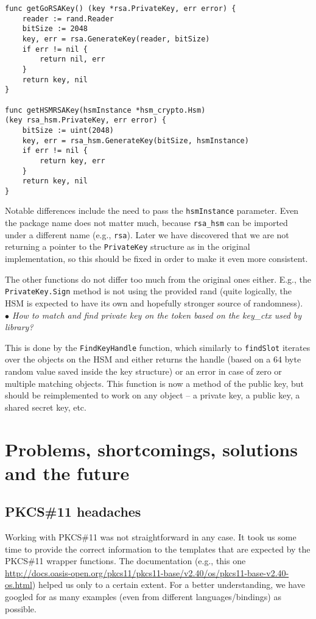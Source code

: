 \documentclass[a4paper]{scrartcl}
\begin{document}
\begin{lstlisting}[caption=Initialization of the HSM, captionpos=b, label={lst:rsaComp}]
func getGoRSAKey() (key *rsa.PrivateKey, err error) {
    reader := rand.Reader
    bitSize := 2048
    key, err = rsa.GenerateKey(reader, bitSize)
    if err != nil {
        return nil, err
    }
    return key, nil
}

func getHSMRSAKey(hsmInstance *hsm_crypto.Hsm)
(key rsa_hsm.PrivateKey, err error) {
    bitSize := uint(2048)
    key, err = rsa_hsm.GenerateKey(bitSize, hsmInstance)
    if err != nil {
        return key, err
    }
    return key, nil
}
\end{lstlisting}

Notable differences include the need to pass the \lstinline[columns=fixed]{hsmInstance} parameter. Even the package name does not matter much, because \lstinline[columns=fixed]{rsa_hsm} can be imported under a different name (e.g., \lstinline[columns=fixed]{rsa}). Later we have discovered that we are not returning a pointer to the \lstinline[columns=fixed]{PrivateKey} structure as in the original implementation, so this should be fixed in order to make it even more consistent.

The other functions do not differ too much from the original ones either. E.g., the \lstinline[columns=fixed]{PrivateKey.Sign} method is not using the provided rand (quite logically, the HSM is expected to have its own and hopefully stronger source of randomness).\\

\textit{$\bullet$ How to match and find private key on the token based on the key\_ctx used by library?}

This is done by the \lstinline[columns=fixed]{FindKeyHandle} function, which similarly to \lstinline[columns=fixed]{findSlot} iterates over the objects on the HSM and either returns the handle (based on a 64 byte random value saved inside the key structure) or an error in case of zero or multiple matching objects. This function is now a method of the public key, but should be reimplemented to work on any object -- a private key, a public key, a shared secret key, etc.

\section{Problems, shortcomings, solutions and the future}

\subsection{PKCS\#11 headaches}
Working with PKCS\#11 was not straightforward in any case. It took us some time to provide the correct information to the templates that are expected by the PKCS\#11 wrapper functions. The documentation (e.g., this one \url{http://docs.oasis-open.org/pkcs11/pkcs11-base/v2.40/os/pkcs11-base-v2.40-os.html}) helped us only to a certain extent. For a better understanding, we have googled for as many examples (even from different languages/bindings) as possible.
\end{document}
